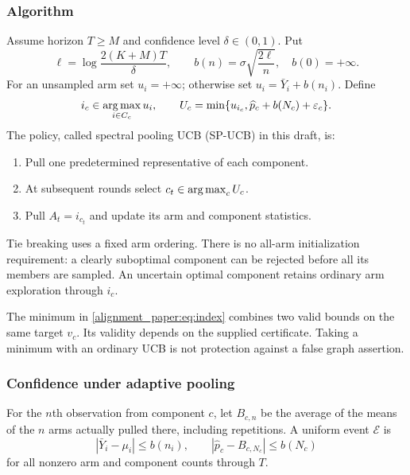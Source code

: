 \subsubsection{Algorithm}
Assume horizon $T\ge M$ and confidence level $\delta\in(0,1)$. Put
\begin{equation}
 \ell=\log\frac{2(K+M)T}{\delta},\qquad
 b(n)=\sigma\sqrt{\frac{2\ell}{n}},\quad b(0)=+\infty.
 \label{alignment_paper:eq:radius}
\end{equation}
For an unsampled arm set $u_i=+\infty$; otherwise set
$u_i=\bar Y_i+b(n_i)$. Define
\begin{equation}
 i_c\in\operatorname*{arg\,max}_{i\in C_c}u_i,\qquad
 U_c=\min\{u_{i_c},\widehat p_c+b(N_c)+\varepsilon_c\}.
 \label{alignment_paper:eq:index}
\end{equation}
The policy, called spectral pooling UCB (SP-UCB) in this draft, is:
\begin{enumerate}
 \item Pull one predetermined representative of each component.
 \item At subsequent rounds select $c_t\in\operatorname*{arg\,max}_c U_c$.
 \item Pull $A_t=i_{c_t}$ and update its arm and component statistics.
\end{enumerate}
Tie breaking uses a fixed arm ordering. There is no all-arm initialization requirement: a clearly suboptimal component can be rejected before all its members are sampled. An uncertain optimal component retains ordinary arm exploration through $i_c$.

The minimum in \eqref{alignment_paper:eq:index} combines two valid bounds on the same target $v_c$. Its validity depends on the supplied certificate. Taking a minimum with an ordinary UCB is not protection against a false graph assertion.

\subsubsection{Confidence under adaptive pooling}
For the $n$th observation from component $c$, let $B_{c,n}$ be the average of the means of the $n$ arms actually pulled there, including repetitions. A uniform event $\mathcal E$ is
\begin{equation}
 |\bar Y_i-\mu_i|\le b(n_i),\qquad
 |\widehat p_c-B_{c,N_c}|\le b(N_c)
 \label{alignment_paper:eq:event}
\end{equation}
for all nonzero arm and component counts through $T$.

